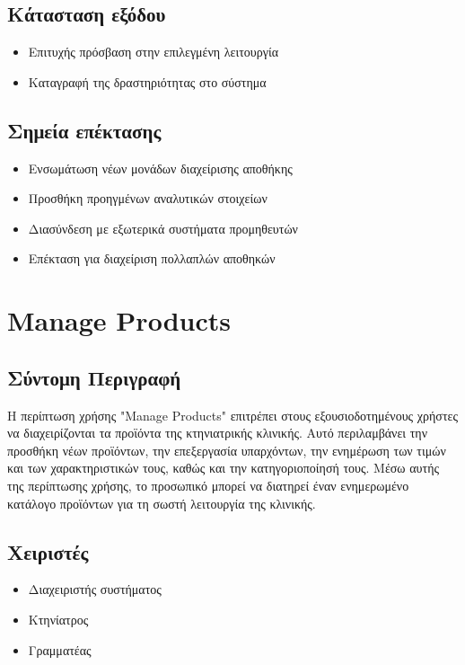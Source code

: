 \documentclass[12pt,a4paper,twoside]{book}
\begin{document}
\subsection{Κάτασταση εξόδου}
\begin{itemize}
  \item Επιτυχής πρόσβαση στην επιλεγμένη λειτουργία
  \item Καταγραφή της δραστηριότητας στο σύστημα
\end{itemize}

\subsection{Σημεία επέκτασης}
\begin{itemize}
  \item Ενσωμάτωση νέων μονάδων διαχείρισης αποθήκης
  \item Προσθήκη προηγμένων αναλυτικών στοιχείων
  \item Διασύνδεση με εξωτερικά συστήματα προμηθευτών
  \item Επέκταση για διαχείριση πολλαπλών αποθηκών
\end{itemize}

\section{Manage Products}

\subsection{Σύντομη Περιγραφή}
Η περίπτωση χρήσης "Manage Products" επιτρέπει στους εξουσιοδοτημένους χρήστες να διαχειρίζονται τα προϊόντα της κτηνιατρικής κλινικής. Αυτό περιλαμβάνει την προσθήκη νέων προϊόντων, την επεξεργασία υπαρχόντων, την ενημέρωση των τιμών και των χαρακτηριστικών τους, καθώς και την κατηγοριοποίησή τους. Μέσω αυτής της περίπτωσης χρήσης, το προσωπικό μπορεί να διατηρεί έναν ενημερωμένο κατάλογο προϊόντων για τη σωστή λειτουργία της κλινικής. %

\subsection{Χειριστές}
\begin{itemize}
  \item Διαχειριστής συστήματος
  \item Κτηνίατρος
  \item Γραμματέας
\end{itemize}
\end{document}
